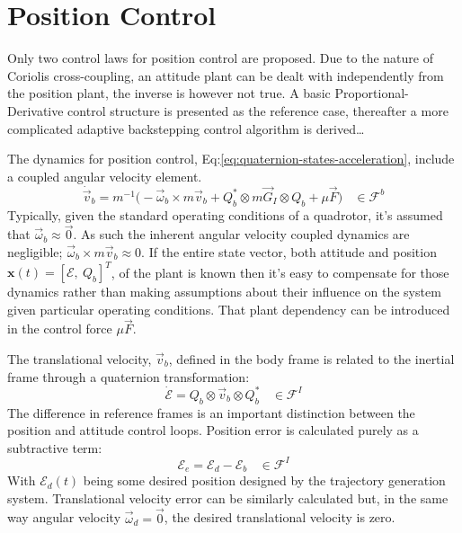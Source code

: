 {\section{Position Control}
\label{sec:control.position}
Only two control laws for position control are proposed. Due to the nature of Coriolis cross-coupling, an attitude plant can be dealt with independently from the position plant, the inverse is however not true. A basic Proportional-Derivative control structure is presented as the reference case, thereafter a more complicated adaptive backstepping control algorithm is derived\ldots
\par
The dynamics for position control, Eq:\ref{eq:quaternion-states-acceleration}, include a coupled angular velocity element.
\begin{equation}\label{eq:position-deriv}
\dot{\vec{v}}_b=m^{-1}\big(-\vec{\omega}_b\times m\vec{v}_b+Q_b^*\otimes m\vec{G}_I\otimes Q_b+\mu\vec{F}\big)~~~~\in\mathcal{F}^b
\end{equation}
Typically, given the standard operating conditions of a quadrotor, it's assumed that $\vec{\omega}_b\approx\vec{0}$. As such the inherent angular velocity coupled dynamics are negligible; $\vec{\omega}_b\times m\vec{v}_b\approx 0$. If the entire state vector, both attitude and position $\mathbf{x}(t)=[\mathcal{E},~Q_b]^T$, of the plant is known then it's easy to compensate for those dynamics rather than making assumptions about their influence on the system given particular operating conditions. That plant dependency can be introduced in the control force $\mu\vec{F}$. 
\par
The translational velocity, $\vec{v}_b$, defined in the body frame is related to the inertial frame through a quaternion transformation:
\begin{equation}
\dot{\mathcal{E}}=Q_b\otimes\vec{v}_b\otimes Q_b^*~~~~\in\mathcal{F}^I
\end{equation}
The difference in reference frames is an important distinction between the position and attitude control loops. Position error is calculated purely as a subtractive term:
\begin{equation}
\mathcal{E}_e=\mathcal{E}_d-\mathcal{E}_b~~~~\in\mathcal{F}^I
\end{equation}
With $\mathcal{E}_d(t)$ being some desired position designed by the trajectory generation system. Translational velocity error can be similarly calculated but, in the same way angular velocity $\vec{\omega}_d=\vec{0}$, the desired translational velocity is zero.
}
